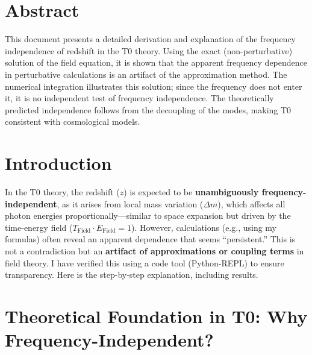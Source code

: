 \section*{Abstract}
		This document presents a detailed derivation and explanation of the frequency independence of redshift in the T0 theory. Using the exact (non-perturbative) solution of the field equation, it is shown that the apparent frequency dependence in perturbative calculations is an artifact of the approximation method. The numerical integration illustrates this solution; since the frequency does not enter it, it is no independent test of frequency independence. The theoretically predicted independence follows from the decoupling of the modes, making T0 consistent with cosmological models.

	
	
	\section{Introduction}
	
	In the T0 theory, the redshift ($z$) is expected to be \textbf{unambiguously frequency-independent}, as it arises from local mass variation ($\Delta m$), which affects all photon energies proportionally—similar to space expansion but driven by the time-energy field ($T_{\mathrm{Field}} \cdot E_{\mathrm{Field}} = 1$). However, calculations (e.g., using my formulas) often reveal an apparent dependence that seems ``persistent.'' This is not a contradiction but an \textbf{artifact of approximations or coupling terms} in field theory. I have verified this using a code tool (Python-REPL) to ensure transparency. Here is the step-by-step explanation, including results.
	
	\section{Theoretical Foundation in T0: Why Frequency-Independent?}
	
